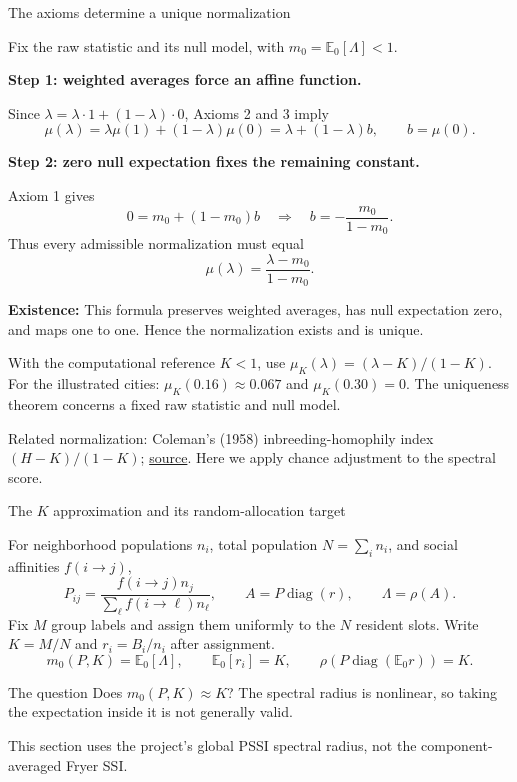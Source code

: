 \documentclass[aspectratio=169,10pt]{beamer}
\begin{document}
\begin{frame}[shrink=0]{The axioms determine a unique normalization}
\small

Fix the raw statistic and its null model, with
$m_0=\mathbb{E}_0[\Lambda]<1$.

\textbf{Step 1: weighted averages force an affine function.}

Since $\lambda=\lambda\cdot1+(1-\lambda)\cdot0$,
Axioms 2 and 3 imply
\[
    \mu(\lambda)
      =\lambda\mu(1)+(1-\lambda)\mu(0)
      =\lambda+(1-\lambda)b,
    \qquad b=\mu(0).
\]

\textbf{Step 2: zero null expectation fixes the remaining constant.}

Axiom 1 gives
\[
    0=m_0+(1-m_0)b
    \quad\Longrightarrow\quad
    b=-\frac{m_0}{1-m_0}.
\]
Thus every admissible normalization must equal
\[
    \boxed{\displaystyle
       \mu(\lambda)=\frac{\lambda-m_0}{1-m_0}}.
\]

\textbf{Existence:} This formula preserves weighted averages,
has null expectation zero, and maps one to one.
Hence the normalization exists and is unique.

\medskip
{\footnotesize
With the computational reference $K<1$, use
$\mu_K(\lambda)=(\lambda-K)/(1-K)$.
For the illustrated cities:
$\mu_K(0.16)\approx0.067$ and $\mu_K(0.30)=0$.
The uniqueness theorem concerns a fixed raw statistic and null model.
\par\smallskip
Related normalization: Coleman's (1958) inbreeding-homophily index
$(H-K)/(1-K)$;
\href{https://doi.org/10.17730/humo.17.4.q5604m676260q8n7}{source}.
Here we apply chance adjustment to the spectral score.
}

\end{frame}

\begin{frame}{The $K$ approximation and its random-allocation target}
\small

For neighborhood populations $n_i$, total population $N=\sum_i n_i$, and social affinities $f(i\to j)$,
\[
 P_{ij}=\frac{f(i\to j)n_j}{\sum_\ell f(i\to\ell)n_\ell},\qquad
 A=P\operatorname{diag}(r),\qquad \Lambda=\rho(A).
\]
Fix $M$ group labels and assign them uniformly to the $N$ resident slots.
Write $K=M/N$ and $r_i=B_i/n_i$ after assignment.
\[
 m_0(P,K)=\mathbb E_0[\Lambda],\qquad
 \mathbb E_0[r_i]=K,\qquad \rho(P\operatorname{diag}(\mathbb E_0r))=K.
\]
\begin{block}{The question}
Does $m_0(P,K)\approx K$? The spectral radius is nonlinear, so taking the expectation inside it is not generally valid.
\end{block}
This section uses the project's global PSSI spectral radius, not the component-averaged Fryer SSI.

\end{frame}
\end{document}
